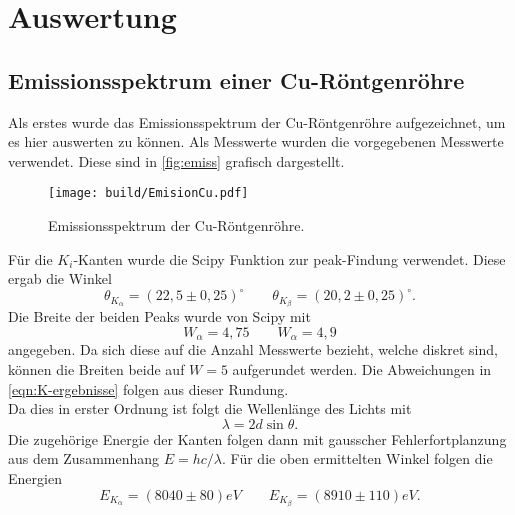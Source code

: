\section{Auswertung}
\label{sec:Auswertung}

\subsection{Emissionsspektrum einer Cu-Röntgenröhre}
\label{sec:Emissionsspektrum einer Cu-Röntgenröhre}
Als erstes wurde das Emissionsspektrum der Cu-Röntgenröhre aufgezeichnet, um es hier
auswerten zu können. Als Messwerte wurden die vorgegebenen Messwerte verwendet. Diese sind
in \autoref{fig:emiss} grafisch dargestellt.
\begin{figure}
	\centering
	\texttt{[image: build/EmisionCu.pdf]}
	\caption{Emissionsspektrum der Cu-Röntgenröhre.}
	\label{fig:emiss}
\end{figure}
Für die $K_i$-Kanten wurde die Scipy Funktion zur peak-Findung verwendet. Diese ergab die
Winkel
\begin{equation}
	\theta_{K_\alpha} = (22,5 \pm 0,25)^\circ
	\qquad
	\theta_{K_\beta} = (20,2 \pm 0,25)^\circ.
	\label{eqn:K-ergebnisse}
\end{equation}
Die Breite der beiden Peaks wurde von Scipy mit
\begin{equation}
	W_\alpha = 4,75
	\qquad
	W_\alpha = 4,9
\end{equation}
angegeben. Da sich diese auf die Anzahl Messwerte bezieht, welche diskret sind, können die
Breiten beide auf $W = 5$ aufgerundet werden. Die Abweichungen in
\autoref{eqn:K-ergebnisse} folgen aus dieser Rundung.
\\
Da dies in erster Ordnung ist folgt die Wellenlänge des Lichts mit
\begin{equation}
	\lambda = 2 d \sin\theta.
\end{equation}
Die zugehörige Energie der Kanten folgen dann mit gausscher Fehlerfortplanzung aus dem
Zusammenhang $E = hc / \lambda$. Für die oben ermittelten Winkel folgen die Energien
\begin{equation}
	E_{K_\alpha} = (8040 \pm 80) \si{eV}
	\qquad
	E_{K_\beta} = (8910 \pm 110) \si{eV}.
\end{equation}

